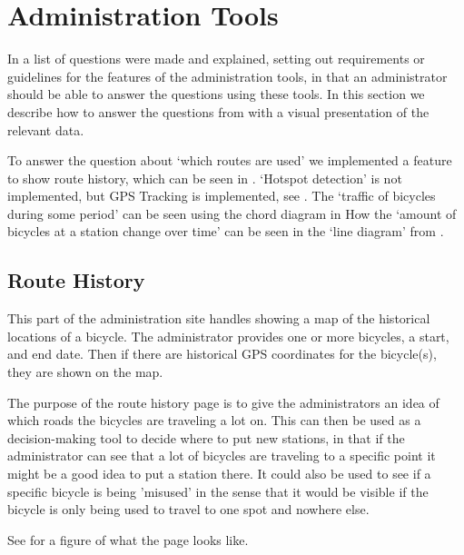 \section{Administration Tools}\label{sec:impAdminTools}
In  a list of questions were made and explained, setting out requirements or guidelines for the features of the administration tools, in that an administrator should be able to answer the questions using these tools. 
In this section we describe how to answer the questions from  with a visual presentation of the relevant data.

To answer the question about `which routes are used' we implemented a feature to show route history, which can be seen in .
`Hotspot detection' is not implemented, but GPS Tracking is implemented, see .
The `traffic of bicycles during some period' can be seen using the chord diagram in 
How the `amount of bicycles at a station change over time' can be seen in the `line diagram' from  .

\subsection{Route History}\label{sec:routeHistory}
This part of the administration site handles showing a map of the historical locations of a bicycle.
The administrator provides one or more bicycles, a start, and end date.
Then if there are historical GPS coordinates for the bicycle(s), they are shown on the map. 

The purpose of the route history page is to give the administrators an idea of which roads the bicycles are traveling a lot on. 
This can then be used as a decision-making tool to decide where to put new stations, in that if the administrator can see that a lot of bicycles are traveling to a specific point it might be a good idea to put a station there.
It could also be used to see if a specific bicycle is being 'misused' in the sense that it would be visible if the bicycle is only being used to travel to one spot and nowhere else.

See  for a figure of what the page looks like.

